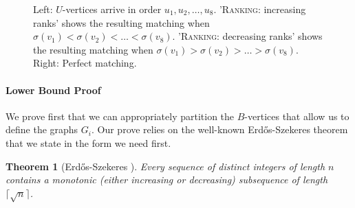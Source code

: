 \documentclass[a4paper]{article}
\newtheorem{theorem}{Theorem}
\begin{document}
\begin{figure}
{\begin{center}
\begin{minipage}{2.5cm}
$ $
\end{minipage}


\end{center}
}
\caption{Left: $U$-vertices arrive in order $u_1, u_2, \dots, u_8$.
'\textsc{Ranking}: increasing ranks' shows the resulting matching when
$\sigma(v_1) < \sigma(v_2) < \dots < \sigma(v_8)$.
'\textsc{Ranking}: decreasing ranks' shows the resulting matching when
$\sigma(v_1) > \sigma(v_2) > \dots > \sigma(v_8)$.
Right: Perfect matching.
\label{fig:lb-ranking}}
\end{figure}




\paragraph*{Lower Bound Proof}
We prove first that we can appropriately partition the $B$-vertices that allow us to define the
graphs $G_i$. Our prove relies on the well-known Erd\H{o}s-Szekeres theorem \cite{es87} that we state in the
form we need first.

\begin{theorem}[Erd\H{o}s-Szekeres \cite{es87}] \label{thm:es}
 Every sequence of distinct integers of length $n$ contains a monotonic (either increasing or
 decreasing) subsequence of length $\lceil \sqrt{n} \rceil$.
\end{theorem}
\end{document}
